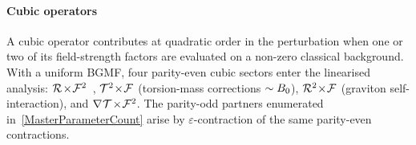 \paragraph*{Cubic operators}
\label{CubicCompletions}
A cubic operator contributes at quadratic order in the
perturbation when one or two of its field-strength factors are
evaluated on a non-zero classical background. With a uniform BGMF,
four parity-even cubic sectors enter the linearised analysis:
$\MAGF{}\!\times\!\FieldF{^2}$~\cite{itin2004maxwell,bahamonde2025torsion},
$\MAGT{^2}\!\times\!\FieldF{}$ (torsion-mass corrections $\sim B_0$),
$\MAGF{^2}\!\times\!\FieldF{}$ (graviton self-interaction),
and $\rcD{}\MAGT{}\!\times\!\FieldF{^2}$.
The parity-odd partners
enumerated in~\cref{MasterParameterCount} arise by
$\varepsilon$-contraction of the same parity-even contractions.


